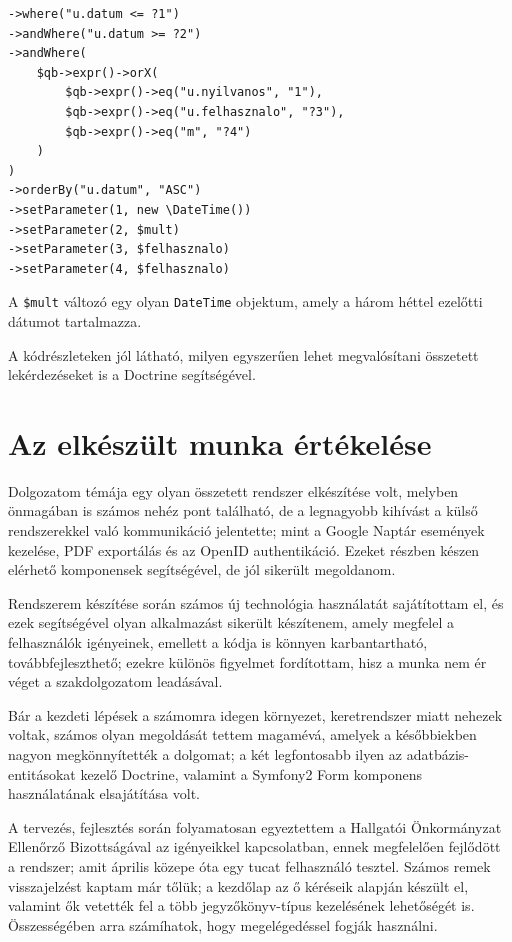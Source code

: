 \documentclass[a4paper,12pt,oneside]{report}
\begin{document}
\begin{lstlisting}
->where("u.datum <= ?1")
->andWhere("u.datum >= ?2")
->andWhere(
    $qb->expr()->orX(
        $qb->expr()->eq("u.nyilvanos", "1"),
        $qb->expr()->eq("u.felhasznalo", "?3"),
        $qb->expr()->eq("m", "?4")
    )
)
->orderBy("u.datum", "ASC")
->setParameter(1, new \DateTime())
->setParameter(2, $mult)
->setParameter(3, $felhasznalo)
->setParameter(4, $felhasznalo)
\end{lstlisting}

A {\tt \$mult} változó egy olyan {\tt DateTime} objektum, amely a három héttel ezelőtti dátumot tartalmazza.

A kódrészleteken jól látható, milyen egyszerűen lehet megvalósítani összetett lekérdezéseket is a Doctrine segítségével.

\section{Az elkészült munka értékelése}

Dolgozatom témája egy olyan összetett rendszer elkészítése volt, melyben önmagában is számos nehéz pont található, de a legnagyobb kihívást a külső rendszerekkel való kommunikáció jelentette; mint a Google Naptár események kezelése, PDF exportálás és az OpenID authentikáció. Ezeket részben készen elérhető komponensek segítségével, de jól sikerült megoldanom.

Rendszerem készítése során számos új technológia használatát sajátítottam el, és ezek segítségével olyan alkalmazást sikerült készítenem, amely megfelel a felhasználók igényeinek, emellett a kódja is könnyen karbantartható, továbbfejleszthető; ezekre különös figyelmet fordítottam, hisz a munka nem ér véget a szakdolgozatom leadásával.

Bár a kezdeti lépések a számomra idegen környezet, keretrendszer miatt nehezek voltak, számos olyan megoldását tettem magamévá, amelyek a későbbiekben nagyon megkönnyítették a dolgomat; a két legfontosabb ilyen az adatbázis-entitásokat kezelő Doctrine, valamint a Symfony2 Form komponens használatának elsajátítása volt.

A tervezés, fejlesztés során folyamatosan egyeztettem a Hallgatói Önkormányzat Ellenőrző Bizottságával az igényeikkel kapcsolatban, ennek megfelelően fejlődött a rendszer; amit április közepe óta egy tucat felhasználó tesztel. Számos remek visszajelzést kaptam már tőlük; a kezdőlap az ő kéréseik alapján készült el, valamint ők vetették fel a több jegyzőkönyv-típus kezelésének lehetőségét is. Összességében arra számíhatok, hogy megelégedéssel fogják használni.
\end{document}
